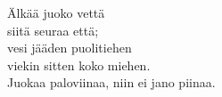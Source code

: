 
            Älkää juoko vettä \\
            siitä seuraa että; \\
            vesi jääden puolitiehen \\
            viekin sitten koko miehen. \\
            Juokaa paloviinaa, niin ei jano piinaa. \\
